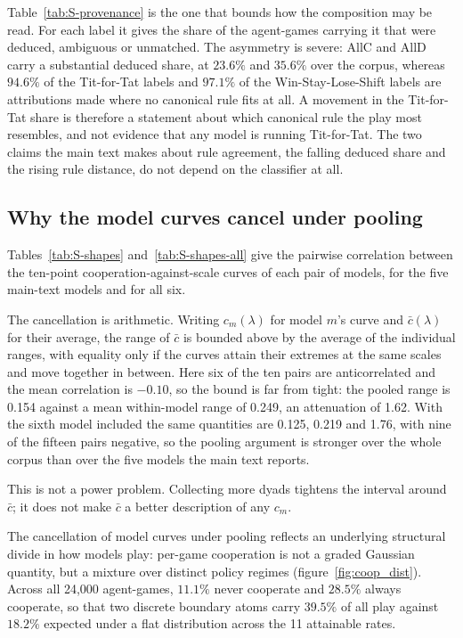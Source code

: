 \documentclass[11pt,a4paper]{article}
\newcommand{\lam}{\lambda}
\begin{document}
Table~\ref{tab:S-provenance} is the one that bounds how the composition may be read. For each label it gives the share of the agent-games carrying it that were deduced, ambiguous or unmatched. The asymmetry is severe: AllC and AllD carry a substantial deduced share, at $23.6\%$ and $35.6\%$ over the corpus, whereas $94.6\%$ of the Tit-for-Tat labels and $97.1\%$ of the Win-Stay-Lose-Shift labels are attributions made where no canonical rule fits at all. A movement in the Tit-for-Tat share is therefore a statement about which canonical rule the play most resembles, and not evidence that any model is running Tit-for-Tat. The two claims the main text makes about rule agreement, the falling deduced share and the rising rule distance, do not depend on the classifier at all.

\subsection{Why the model curves cancel under pooling}\label{appendix:pooling}

Tables~\ref{tab:S-shapes} and~\ref{tab:S-shapes-all} give the pairwise correlation between the ten-point cooperation-against-scale curves of each pair of models, for the five main-text models and for all six.

The cancellation is arithmetic. Writing $c_m(\lam)$ for model $m$'s curve and $\bar{c}(\lam)$ for their average, the range of $\bar{c}$ is bounded above by the average of the individual ranges, with equality only if the curves attain their extremes at the same scales and move together in between. Here six of the ten pairs are anticorrelated and the mean correlation is $-0.10$, so the bound is far from tight: the pooled range is 0.154 against a mean within-model range of 0.249, an attenuation of 1.62. With the sixth model included the same quantities are 0.125, 0.219 and 1.76, with nine of the fifteen pairs negative, so the pooling argument is stronger over the whole corpus than over the five models the main text reports.

This is not a power problem. Collecting more dyads tightens the interval around $\bar{c}$; it does not make $\bar{c}$ a better description of any $c_m$.

The cancellation of model curves under pooling reflects an underlying structural divide in how models play: per-game cooperation is not a graded Gaussian quantity, but a mixture over distinct policy regimes (figure~\ref{fig:coop_dist}). Across all 24{,}000 agent-games, $11.1\%$ never cooperate and $28.5\%$ always cooperate, so that two discrete boundary atoms carry $39.5\%$ of all play against $18.2\%$ expected under a flat distribution across the 11 attainable rates.
\end{document}
